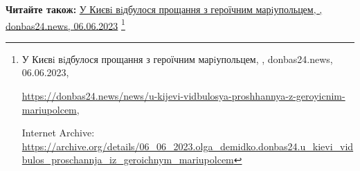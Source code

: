  
 
 
 
 

\def\pubIA{https://archive.org/details/06_06_2023.olga_demidko.donbas24.u_kievi_vidbulos_proschannja_iz_geroichnym_mariupolcem}
\def\pubTitle{У Києвi вiдбулося прощання з героїчним марiупольцем}
\def\pubDate{06.06.2023}
\def\pubOrigin{https://donbas24.news/news/u-kijevi-vidbulosya-proshhannya-z-geroyicnim-mariupolcem}
\def\pubAuthor{\pubAuthorDemidko}
\def\pubSite{donbas24.news}

\textbf{Читайте також:} \href{\pubIA}{%
\pubTitle, \pubAuthor, \pubSite, \pubDate}%
\footnote{\pubTitle, \pubAuthor, \pubSite, \pubDate, \par\url{\pubOrigin}, \par Internet Archive: \url{\pubIA}}
